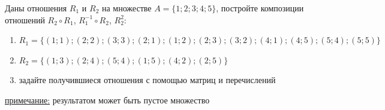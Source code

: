 \question
Даны отношения $R_1$ и $R_2$ на множестве $A = \{1; 2; 3; 4; 5\}$, постройте композиции отношений $R_2\circ R_1$,  $R_1^{-1}\circ R_2$, $R_2^2$:
\begin{enumerate}
	\renewcommand{\labelenumi}{\alph{enumi})}
	\item $R_1 = \{(1; 1); (2; 2); (3; 3); (2; 1); (1; 2); (2; 3); (3; 2); (4; 1); (4; 5); (5; 4); (5; 5)\}$
	\item $R_2 = \{(1; 3); (2; 4); (5; 4); (1; 5); (4; 2); (2; 5)\}$
	\item задайте получившиеся отношения с помощью матриц и перечислений 
\end{enumerate}

\underline{примечание:} результатом может быть пустое множество
